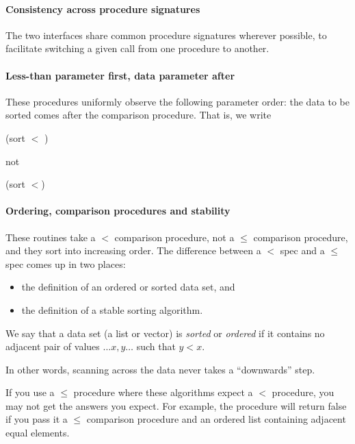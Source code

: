 \paragraph{Consistency across procedure signatures}

The two interfaces share common procedure signatures wherever
possible, to facilitate switching a given call from one procedure
to another.
        
\paragraph{Less-than parameter first, data parameter after}

These procedures uniformly observe the following parameter order:
the data to be sorted comes after the comparison procedure.
That is, we write

\begin{example}
  (sort \(<\) )
\end{example}

not

\begin{example}
  (sort  \(<\))
\end{example}
%

\paragraph{Ordering, comparison procedures and stability}

These routines take a $<$ comparison procedure, not a $\leq$ comparison
procedure, and they sort into increasing order. The difference between
a $<$ spec and a $\leq$ spec comes up in two places: 

\begin{itemize}
\item the definition of an ordered or sorted data set, and
\item the definition of a stable sorting algorithm.
\end{itemize}
%

We say that a data set (a list or vector) is \textit{sorted} or
\textit{ordered} if it contains no adjacent pair of values $\ldots x,
y \ldots$ such that $y < x$.

In other words, scanning across the data never takes a ``downwards'' step.

If you use a $\leq$ procedure where these algorithms expect a $<$
procedure, you may not get the answers you expect. For example,
the  procedure will return false if you pass it a $\leq$ comparison
procedure and an ordered list containing adjacent equal elements.

